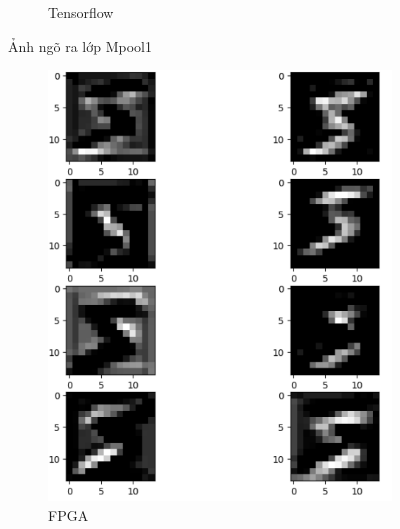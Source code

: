 \begin{figure}[H]
\begin{subfigure}[b]{0.45\linewidth}
        \caption{Tensorflow}
        \label{fig:enter-label}
        \end{subfigure}
    \caption{Ảnh ngõ ra lớp Mpool1}
    \label{fig:main}
\end{figure}

\begin{figure}[H]
\centering
    \begin{subfigure}[b]{0.45\linewidth}
        \includegraphics[width=1\linewidth]{Images/fpgac3.png}
        \caption{FPGA}
        \label{fig:enter-label}
    \end{subfigure}
    \begin{subfigure}[b]{0.45\linewidth}

\end{subfigure}
\end{figure}
